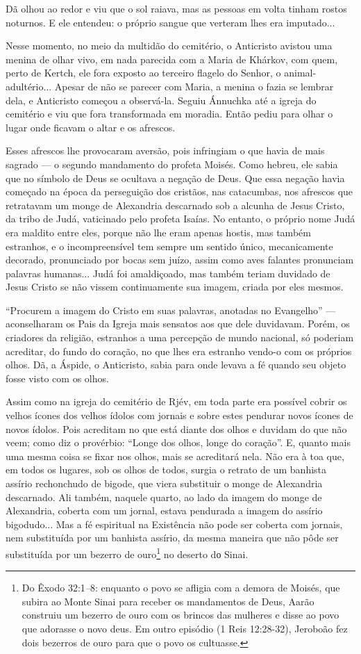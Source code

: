 Dã olhou ao redor e viu que o sol raiava, mas as pessoas em volta tinham
rostos noturnos. E ele entendeu: o próprio sangue que verteram lhes era
imputado...

Nesse momento, no meio da multidão do cemitério, o Anticristo avistou
uma menina de olhar vivo, em nada parecida com a Maria de Khárkov, com
quem, perto de Kertch, ele fora exposto ao terceiro flagelo do Senhor, o
animal-adultério... Apesar de não se parecer com Maria, a menina o fazia
se lembrar dela, e Anticristo começou a observá-la. Seguiu Ánnuchka até
a igreja do cemitério e viu que fora transformada em moradia. Então
pediu para olhar o lugar onde ficavam o altar e os afrescos.

Esses afrescos lhe provocaram aversão, pois infringiam o que havia de
mais sagrado --- o segundo mandamento do profeta Moisés. Como hebreu,
ele sabia que no símbolo de Deus se ocultava a negação de Deus. Que essa
negação havia começado na época da perseguição dos cristãos, nas
catacumbas, nos afrescos que retratavam um monge de Alexandria
descarnado sob a alcunha de Jesus Cristo, da tribo de Judá, vaticinado
pelo profeta Isaías. No entanto, o próprio nome Judá era maldito entre
eles, porque não lhe eram apenas hostis, mas também estranhos, e o
incompreensível tem sempre um sentido único, mecanicamente decorado,
pronunciado por bocas sem juízo, assim como aves falantes pronunciam
palavras humanas... Judá foi amaldiçoado, mas também teriam duvidado de
Jesus Cristo se não vissem continuamente sua imagem, criada por eles
mesmos.

``Procurem a imagem do Cristo em suas palavras, anotadas no Evangelho''
--- aconselharam os Pais da Igreja mais sensatos aos que dele duvidavam.
Porém, os criadores da religião, estranhos a uma percepção de mundo
nacional, só poderiam acreditar, do fundo do coração, no que lhes era
estranho vendo-o com os próprios olhos. Dã, a Áspide, o Anticristo,
sabia para onde levava a fé quando seu objeto fosse visto com os olhos.

Assim como na igreja do cemitério de Rjév, em toda parte era possível
cobrir os velhos ícones dos velhos ídolos com jornais e sobre estes
pendurar novos ícones de novos ídolos. Pois acreditam no que está diante
dos olhos e duvidam do que não veem; como diz o provérbio: ``Longe dos
olhos, longe do coração''. E, quanto mais uma mesma coisa se fixar nos
olhos, mais se acreditará nela. Não era à toa que, em todos os lugares,
sob os olhos de todos, surgia o retrato de um banhista assírio
rechonchudo de bigode, que viera substituir o monge de Alexandria
descarnado. Ali também, naquele quarto, ao lado da imagem do monge de
Alexandria, coberta com um jornal, estava pendurada a imagem do assírio
bigodudo... Mas a fé espiritual na Existência não pode ser coberta com
jornais, nem substituída por um banhista assírio, da mesma maneira que
não pôde ser substituída por um bezerro de ouro\footnote{Do Êxodo
  32:1\emph{--}8: enquanto o povo se afligia com a demora de Moisés, que
  subira ao Monte Sinai para receber os mandamentos de Deus, Aarão
  construiu um bezerro de ouro com os brincos das mulheres e disse ao
  povo que adorasse o novo deus. Em outro episódio (1 Reis 12:28-32),
  Jeroboão fez dois bezerros de ouro para que o povo os cultuasse.} no
deserto dо Sinai.

